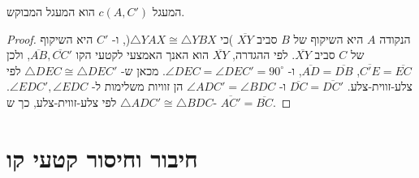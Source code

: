 המעגל
$c(A,C')$
הוא המעגל המבוקש.


\begin{proof}
הנקודה
$A$
היא השיקוף של 
$B$
סביב 
$\overline{XY}$
)כי
$\triangle YAX\cong \triangle YBX$(, ו-%
$C'$
היא השיקוף של 
$C$
סביב
$\overline{XY}$.
לפי ההגדרה, 
$\overline{XY}$
הוא האנך האמצעי לקטעי הקו 
$\overline{AB},\overline{CC}'$,
ולכן
$\overline{C'E}=\overline{EC}$,
$\overline{AD}=\overline{DB}$,
ו-%
$\angle DEC=\angle DEC'=90^\circ$.
מכאן ש-%
$\triangle DEC\cong\triangle DEC'$
לפי צלע-זווית-צלע.
$\overline{DC}=\overline{DC'}$
ו-%
$\angle ADC'=\angle BDC$
הן זוויות משלימות ל-%
$\angle EDC', \angle EDC$.
$\triangle ADC'\cong\triangle BDC$
לפי צלע-זווית-צלע,
כך ש-%
$\overline{AC'}=\overline{BC}$.
\end{proof}


\section{חיבור וחיסור קטעי קו}\label{s.add-subtract}

